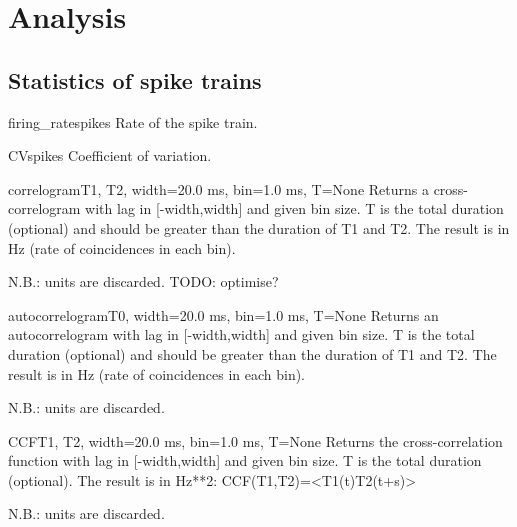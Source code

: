 \documentclass[letterpaper,10pt,english]{manual}
\begin{document}
\resetcurrentobjects
\hypertarget{--doc-reference-analysis}{}

\section{Analysis}


\subsection{Statistics of spike trains}

\hypertarget{brian.firing_rate}{}\begin{funcdesc}{firing\_rate}{spikes}
Rate of the spike train.
\end{funcdesc}

\hypertarget{brian.CV}{}\begin{funcdesc}{CV}{spikes}
Coefficient of variation.
\end{funcdesc}

\hypertarget{brian.correlogram}{}\begin{funcdesc}{correlogram}{T1, T2, width=20.0 ms, bin=1.0 ms, T=None}
Returns a cross-correlogram with lag in {[}-width,width{]} and given bin size.
T is the total duration (optional) and should be greater than the duration of T1 and T2.
The result is in Hz (rate of coincidences in each bin).

N.B.: units are discarded.
TODO: optimise?
\end{funcdesc}

\hypertarget{brian.autocorrelogram}{}\begin{funcdesc}{autocorrelogram}{T0, width=20.0 ms, bin=1.0 ms, T=None}
Returns an autocorrelogram with lag in {[}-width,width{]} and given bin size.
T is the total duration (optional) and should be greater than the duration of T1 and T2.
The result is in Hz (rate of coincidences in each bin).

N.B.: units are discarded.
\end{funcdesc}

\hypertarget{brian.CCF}{}\begin{funcdesc}{CCF}{T1, T2, width=20.0 ms, bin=1.0 ms, T=None}
Returns the cross-correlation function with lag in {[}-width,width{]} and given bin size.
T is the total duration (optional).
The result is in Hz**2:
CCF(T1,T2)=\textless{}T1(t)T2(t+s)\textgreater{}

N.B.: units are discarded.
\end{funcdesc}
\end{document}
